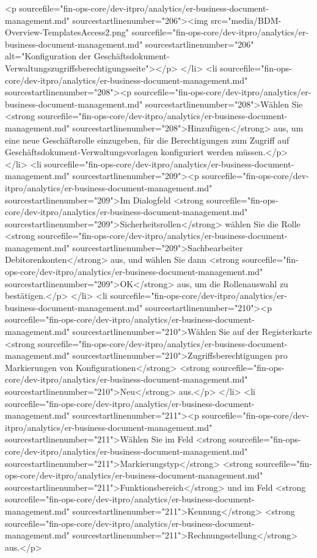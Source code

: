<p sourcefile="fin-ops-core/dev-itpro/analytics/er-business-document-management.md" sourcestartlinenumber="206"><img src="media/BDM-Overview-TemplatesAccess2.png" sourcefile="fin-ops-core/dev-itpro/analytics/er-business-document-management.md" sourcestartlinenumber="206" alt="Konfiguration der Geschäftsdokument-Verwaltungszugriffsberechtigungsseite"></p>
</li>
<li sourcefile="fin-ops-core/dev-itpro/analytics/er-business-document-management.md" sourcestartlinenumber="208"><p sourcefile="fin-ops-core/dev-itpro/analytics/er-business-document-management.md" sourcestartlinenumber="208">Wählen Sie <strong sourcefile="fin-ops-core/dev-itpro/analytics/er-business-document-management.md" sourcestartlinenumber="208">Hinzufügen</strong> aus, um eine neue Geschäftsrolle einzugeben, für die Berechtigungen zum Zugriff auf Geschäftsdokument-Verwaltungsvorlagen konfiguriert werden müssen.</p>
</li>
<li sourcefile="fin-ops-core/dev-itpro/analytics/er-business-document-management.md" sourcestartlinenumber="209"><p sourcefile="fin-ops-core/dev-itpro/analytics/er-business-document-management.md" sourcestartlinenumber="209">Im Dialogfeld <strong sourcefile="fin-ops-core/dev-itpro/analytics/er-business-document-management.md" sourcestartlinenumber="209">Sicherheitsrollen</strong> wählen Sie die Rolle <strong sourcefile="fin-ops-core/dev-itpro/analytics/er-business-document-management.md" sourcestartlinenumber="209">Sachbearbeiter Debitorenkonten</strong> aus, und wählen Sie dann <strong sourcefile="fin-ops-core/dev-itpro/analytics/er-business-document-management.md" sourcestartlinenumber="209">OK</strong> aus, um die Rollenauswahl zu bestätigen.</p>
</li>
<li sourcefile="fin-ops-core/dev-itpro/analytics/er-business-document-management.md" sourcestartlinenumber="210"><p sourcefile="fin-ops-core/dev-itpro/analytics/er-business-document-management.md" sourcestartlinenumber="210">Wählen Sie auf der Registerkarte <strong sourcefile="fin-ops-core/dev-itpro/analytics/er-business-document-management.md" sourcestartlinenumber="210">Zugriffsberechtigungen pro Markierungen von Konfigurationen</strong> <strong sourcefile="fin-ops-core/dev-itpro/analytics/er-business-document-management.md" sourcestartlinenumber="210">Neu</strong> aus.</p>
</li>
<li sourcefile="fin-ops-core/dev-itpro/analytics/er-business-document-management.md" sourcestartlinenumber="211"><p sourcefile="fin-ops-core/dev-itpro/analytics/er-business-document-management.md" sourcestartlinenumber="211">Wählen Sie im Feld <strong sourcefile="fin-ops-core/dev-itpro/analytics/er-business-document-management.md" sourcestartlinenumber="211">Markierungstyp</strong> <strong sourcefile="fin-ops-core/dev-itpro/analytics/er-business-document-management.md" sourcestartlinenumber="211">Funktionsbereich</strong> und im Feld <strong sourcefile="fin-ops-core/dev-itpro/analytics/er-business-document-management.md" sourcestartlinenumber="211">Kennung</strong> <strong sourcefile="fin-ops-core/dev-itpro/analytics/er-business-document-management.md" sourcestartlinenumber="211">Rechnungsstellung</strong> aus.</p>
